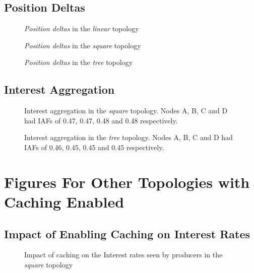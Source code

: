 \begin{appendices}
\section{Position Deltas}
\begin{figure}[H]
    \centering
    \caption{\textit{Position deltas} in the \textit{linear} topology}
\end{figure}

\begin{figure}[H]
    \centering
    \caption{\textit{Position deltas} in the \textit{square} topology}
\end{figure}

\begin{figure}[H]
    \centering
    \caption{\textit{Position deltas} in the \textit{tree} topology}
\end{figure}

\section{Interest Aggregation}
\begin{figure}[H]
    \centering
    \caption{Interest aggregation in the \textit{square} topology. Nodes A, B, C and D had IAFs of 0.47, 0.47, 0.48 and 0.48 respectively.}
\end{figure}

\begin{figure}[H]
    \centering
    \caption{Interest aggregation in the \textit{tree} topology. Nodes A, B, C and D had IAFs of 0.46, 0.45, 0.45 and 0.45 respectively.}
\end{figure}

\chapter{Figures For Other Topologies with Caching Enabled}\label{app:eval:caching}
\section{Impact of Enabling Caching on Interest Rates}
\begin{figure}[H]
    \centering
    \caption{Impact of caching on the Interest rates seen by producers in the \textit{square} topology}
\end{figure}


\end{appendices}
